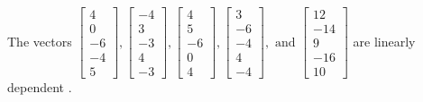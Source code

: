 \begin{exercise}
\begin{exerciseStatement}
  \end{exerciseStatement}
  \begin{exerciseAnswer}
   The vectors \(\left[\begin{array}{r}
4 \\
0 \\
-6 \\
-4 \\
5
\end{array}\right] , \left[\begin{array}{r}
-4 \\
3 \\
-3 \\
4 \\
-3
\end{array}\right] , \left[\begin{array}{r}
4 \\
5 \\
-6 \\
0 \\
4
\end{array}\right] , \left[\begin{array}{r}
3 \\
-6 \\
-4 \\
4 \\
-4
\end{array}\right] , \text{ and } \left[\begin{array}{r}
12 \\
-14 \\
9 \\
-16 \\
10
\end{array}\right]\) are 
  	 linearly dependent  .
  


  \end{exerciseAnswer}
\end{exercise}